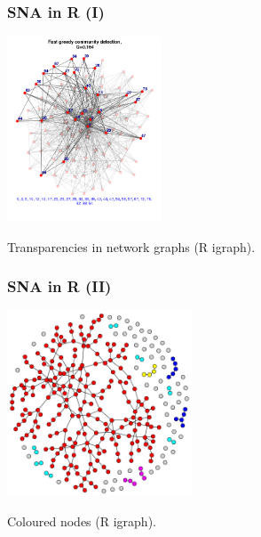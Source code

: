 
\begin{frame}
\frametitle{SNA in R (I)}

\begin{center}
 \includegraphics[height=5.5cm]{figs/sna1-igraph.png}
\end{center}

\begin{flushright}
\small Transparencies in network graphs (R igraph).
\end{flushright}

\end{frame}


\begin{frame}
\frametitle{SNA in R (II)}

\begin{center}
 \includegraphics[height=5.5cm]{figs/sna2-igraph.png}
\end{center}

\begin{flushright}
\small Coloured nodes (R igraph).
\end{flushright}

\end{frame}


